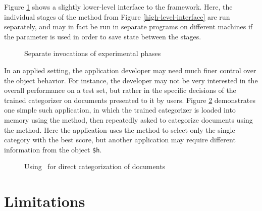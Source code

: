 Figure \ref{medium-level-interface} shows a slightly lower-level
interface to the framework.  Here, the individual stages of the
 method from Figure \ref{high-level-interface}
are run separately, and may in fact be run in separate programs on
different machines if the  parameter is used in
order to save state between the stages.

\begin{figure}
\caption{Separate invocations of experimental phases}
\label{medium-level-interface}
\end{figure}

In an applied setting, the application developer may need much finer
control over the object behavior.  For instance, the developer may not
be very interested in the overall performance on a test set, but
rather in the specific decisions of the trained categorizer on
documents presented to it by users.  Figure
\ref{application-interface} demonstrates one simple such application,
in which the trained categorizer is loaded into memory using the
 method, then repeatedly asked to categorize
documents using the  method.  Here the application
uses the  method to select only the single
category with the best score, but another application may require
different information from the  object \texttt{\$h}.

\begin{figure}
\caption{Using \aicat\ for direct categorization of documents}
\label{application-interface}
\end{figure}



\section{Limitations}

